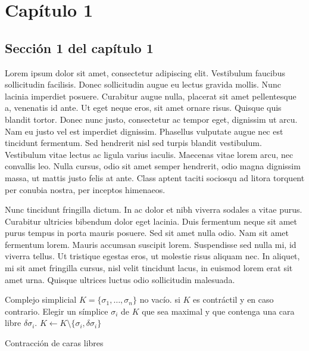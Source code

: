 \chapter{Capítulo 1}\label{ch:capitulo}

\section{Sección 1 del capítulo 1}
Lorem ipsum dolor sit amet, consectetur adipiscing elit. Vestibulum faucibus
sollicitudin facilisis. Donec sollicitudin augue eu lectus gravida mollis.
Nunc lacinia imperdiet posuere. Curabitur augue nulla, placerat sit amet
pellentesque a, venenatis id ante. Ut eget neque eros, sit amet ornare risus.
Quisque quis blandit tortor. Donec nunc justo, consectetur ac tempor eget,
dignissim ut arcu. Nam eu justo vel est imperdiet dignissim. Phasellus
vulputate augue nec est tincidunt fermentum. Sed hendrerit nisl sed turpis
blandit vestibulum. Vestibulum vitae lectus ac ligula varius iaculis. Maecenas
vitae lorem arcu, nec convallis leo. Nulla cursus, odio sit amet semper
hendrerit, odio magna dignissim massa, ut mattis justo felis at ante. Class
aptent taciti sociosqu ad litora torquent per conubia nostra, per inceptos
himenaeos.

Nunc tincidunt fringilla dictum. In ac dolor et nibh viverra sodales a vitae
purus. Curabitur ultricies bibendum dolor eget lacinia. Duis fermentum neque
sit amet purus tempus in porta mauris posuere. Sed sit amet nulla odio. Nam
sit amet fermentum lorem. Mauris accumsan suscipit lorem. Suspendisse sed
nulla mi, id viverra tellus. Ut tristique egestas eros, ut molestie risus
aliquam nec. In aliquet, mi sit amet fringilla cursus, nisl velit tincidunt
lacus, in euismod lorem erat sit amet urna. Quisque ultrices luctus odio
sollicitudin malesuada.

\begin{algorithm}
\begin{algorithmic}[1]
\REQUIRE Complejo simplicial $K=\{\sigma_1, \dots, \sigma_n \}$ no vacío. \label{lin:lineaRara}
\ENSURE \TRUE{} si $K$ es contráctil y \FALSE{} en caso contrario.
\STATE Elegir un símplice $\sigma_i$ de $K$ que sea maximal y que contenga una cara libre $\delta\sigma_i$.
\RETURN \FALSE
\ELSE
\STATE $K \leftarrow K \setminus \{\sigma_i, \delta\sigma_i\}$
\ENDIF
\ENDWHILE
\RETURN \TRUE
\end{algorithmic}
\caption{Contracción de caras libres}\label{alg:algoritmoRaro}
\end{algorithm}

